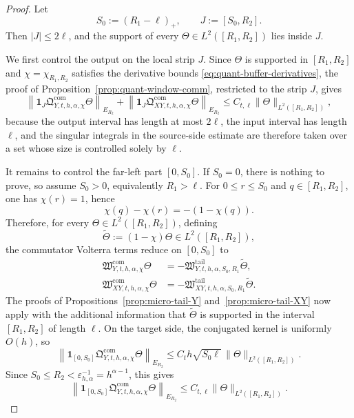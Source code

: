 \documentclass[11pt,a4paper]{amsart}
\theoremstyle{plain}
\theoremstyle{definition}
\theoremstyle{remark}
\newcommand{\one}{\mathbf 1}
\begin{document}
\begin{proof}
Let
\[
S_0:=(R_1-\ell)_+,
\qquad
J:=[S_0,R_2].
\]
Then \(|J|\le 2\ell\), and the support of every \(\Theta\in L^2([R_1,R_2])\) lies inside \(J\).

We first control the output on the local strip \(J\). Since \(\Theta\) is supported in \([R_1,R_2]\)
and \(\chi=\chi_{R_1,R_2}\) satisfies the derivative bounds
\eqref{eq:quant-buffer-derivatives}, the proof of Proposition~\ref{prop:quant-window-comm},
restricted to the strip \(J\), gives
\begin{equation}\label{eq:annulus-local-strip}
\left\|
\one_J\mathfrak Q_{Y,t,h,\alpha,\chi}^{\mathrm{com}}\Theta
\right\|_{E_{R_2}}
+
\left\|
\one_J\mathfrak Q_{XY,t,h,\alpha,\chi}^{\mathrm{com}}\Theta
\right\|_{E_{R_2}}
\le
C_{t,\ell}\|\Theta\|_{L^2([R_1,R_2])},
\end{equation}
because the output interval has length at most \(2\ell\), the input interval has length \(\ell\),
and the singular integrals in the source-side estimate are therefore taken over a set whose size is
controlled solely by \(\ell\).

It remains to control the far-left part \([0,S_0]\). If \(S_0=0\), there is nothing to prove, so
assume \(S_0>0\), equivalently \(R_1>\ell\). For \(0\le r\le S_0\) and \(q\in[R_1,R_2]\), one
has \(\chi(r)=1\), hence
\[
\chi(q)-\chi(r)=-(1-\chi(q)).
\]
Therefore, for every \(\Theta\in L^2([R_1,R_2])\), defining
\[
\widetilde\Theta:=(1-\chi)\Theta\in L^2([R_1,R_2]),
\]
the commutator Volterra terms reduce on \([0,S_0]\) to
\begin{align*}
\mathfrak W_{Y,t,h,\alpha,\chi}^{\mathrm{com}}\Theta
&=
-\mathfrak W_{Y,t,h,\alpha,S_0,R_1}^{\mathrm{tail}}\widetilde\Theta,\\
\mathfrak W_{XY,t,h,\alpha,\chi}^{\mathrm{com}}\Theta
&=
-\mathfrak W_{XY,t,h,\alpha,S_0,R_1}^{\mathrm{tail}}\widetilde\Theta.
\end{align*}
The proofs of Propositions~\ref{prop:micro-tail-Y} and~\ref{prop:micro-tail-XY} now apply with the
additional information that \(\widetilde\Theta\) is supported in the interval \([R_1,R_2]\) of
length \(\ell\). On the target side, the conjugated kernel is uniformly \(O(h)\), so
\[
\left\|
\one_{[0,S_0]}
\mathfrak Q_{Y,t,h,\alpha,\chi}^{\mathrm{com}}\Theta
\right\|_{E_{R_2}}
\le
C_t h\sqrt{S_0\ell}\,\|\Theta\|_{L^2([R_1,R_2])}.
\]
Since \(S_0\le R_2<\varepsilon_{h,\alpha}^{-1}=h^{\alpha-1}\), this gives
\begin{equation}\label{eq:annulus-inner-Y}
\left\|
\one_{[0,S_0]}
\mathfrak Q_{Y,t,h,\alpha,\chi}^{\mathrm{com}}\Theta
\right\|_{E_{R_2}}
\le
C_{t,\ell}\|\Theta\|_{L^2([R_1,R_2])}.
\end{equation}


\end{proof}
\end{document}

